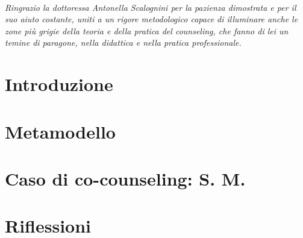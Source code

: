 \documentclass[a4paper,oneside,openany, justified]{tufte-book} %
\begin{document}
\tableofcontents




\clearpage %

~\vfill
\begin{doublespace}
\noindent\fontsize{18}{22}\selectfont\itshape
\nohyphenation
Ringrazio la dottoressa Antonella Scalognini per la pazienza dimostrata e per il suo aiuto costante, uniti a un rigore metodologico capace di illuminare anche le zone più grigie della teoria e della pratica del counseling, che fanno di lei un temine di paragone, nella didattica e nella pratica professionale.
\end{doublespace}
\vfill
\vfill


\chapter{Introduzione}
\label{ch:introduzione}

 
\mainmatter

\chapter{Metamodello}
\label{ch:metamodello}



\chapter{Caso di co-counseling: S. M.}
\label{ch:caso}


\chapter{Riflessioni }
\label{ch:riflessioni}


\backmatter

\label{ch:biblio}
 

\printindex
\end{document}
